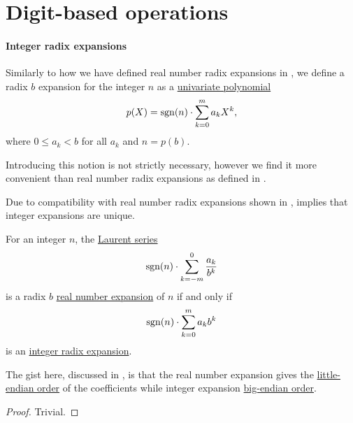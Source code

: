 \section{Digit-based operations}\label{sec:digit_based_operations}

\paragraph{Integer radix expansions}

\begin{definition}\label{def:integer_radix_expansion}
  Similarly to how we have defined real number radix expansions in , we define a radix \( b \) expansion for the integer \( n \) as a \hyperref[def:univariate_polynomial]{univariate polynomial}
  \begin{equation*}
    p(X) = \operatorname{sgn}(n) \cdot \sum_{k=0}^m a_k X^k,
  \end{equation*}
  where \( 0 \leq a_k < b \) for all \( a_k \) and \( n = p(b) \).
\end{definition}
\begin{comments}
  \item Introducing this notion is not strictly necessary, however we find it more convenient than real number radix expansions as defined in .

  \item Due to compatibility with real number radix expansions shown in ,  implies that integer expansions are unique.
\end{comments}

\begin{proposition}\label{thm:integer_and_real_radix_expansions}
  For an integer \( n \), the \hyperref[def:formal_laurent_series]{Laurent series}
  \begin{equation}\label{eq:thm:integer_and_real_radix_expansions/series}
    \operatorname{sgn}(n) \cdot \sum_{k=-m}^0 \frac {a_k} {b^k}
  \end{equation}
  is a radix \( b \) \hyperref[def:real_number_radix_expansion]{real number expansion} of \( n \) if and only if
  \begin{equation}\label{eq:thm:integer_and_real_radix_expansions/polynomial}
    \operatorname{sgn}(n) \cdot \sum_{k=0}^m a_k b^k
  \end{equation}
  is an \hyperref[def:integer_radix_expansion]{integer radix expansion}.
\end{proposition}
\begin{comments}
  \item The gist here, discussed in , is that the real number expansion gives the \hyperref[def:endianness]{little-endian order} of the coefficients while integer expansion \hyperref[def:endianness]{big-endian order}.
\end{comments}
\begin{proof}
  Trivial.
\end{proof}

